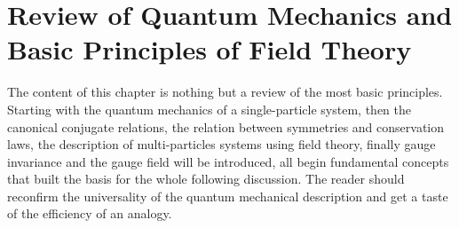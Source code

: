 
\chapter[Review of Quantum Mechanics and Basic Principles of Field Theory]{Review of Quantum Mechanics and \\ Basic Principles of Field Theory}
The content of this chapter is nothing but a review of the most basic principles. Starting with the quantum mechanics of a single-particle system, then the canonical conjugate relations, the relation between symmetries and conservation laws, the description of multi-particles systems using field theory, finally gauge invariance and the gauge field will be introduced, all begin fundamental concepts that built the basis for the whole following discussion. The reader should reconfirm the universality of the quantum mechanical description and get a taste of the efficiency of an analogy. 

